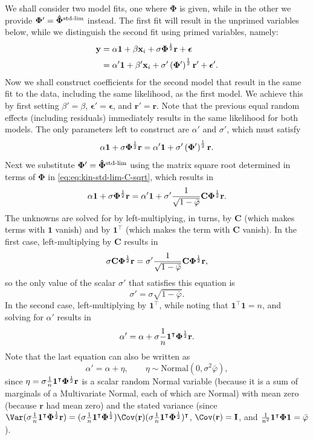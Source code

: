 \documentclass[11pt]{article}
\newcommand{\kinMat}{%
  \ensuremath{%
    \mathbf{\Phi}
  }%
  \xspace%
}%
\newcommand{\kinMatEstNamed}[1]{%
  \ensuremath{%
    \mathbf{\hat{\Phi}}^\text{#1}
  }%
  \xspace%
}%
\newcommand{\kinMatStdLim}{%
  \kinMatEstNamed{std-lim}
}%
\begin{document}
We shall consider two model fits, one where \kinMat is given, while in the other we provide $\kinMat' = \kinMatStdLim$ instead.
The first fit will result in the unprimed variables below, while we distinguish the second fit using primed variables, namely:
\begin{align*}
  \mathbf{y}
  &=
    \alpha \mathbf{1} + \beta \mathbf{x}_i + \sigma \kinMat^\frac{1}{2} \mathbf{r} + \boldsymbol{\epsilon}
  \\
  &=
    \alpha' \mathbf{1} + \beta' \mathbf{x}_i + \sigma' \left( \kinMat' \right)^\frac{1}{2} \mathbf{r}' + \boldsymbol{\epsilon}'
    .
\end{align*}
Now we shall construct coefficients for the second model that result in the same fit to the data, including the same likelihood, as the first model.
We achieve this by first setting
$\beta' = \beta$,
$\boldsymbol{\epsilon}' = \boldsymbol{\epsilon}$,
and
$\mathbf{r}' = \mathbf{r}$.
Note that the previous equal random effects (including residuals) immediately results in the same likelihood for both models.
The only parameters left to construct are $\alpha'$ and $\sigma'$, which must satisfy
$$
\alpha \mathbf{1}  + \sigma \kinMat^\frac{1}{2} \mathbf{r}
=
\alpha' \mathbf{1} + \sigma' \left( \kinMat' \right)^\frac{1}{2} \mathbf{r}
.
$$
Next we substitute $\kinMat' = \kinMatStdLim$ using the matrix square root determined in terms of \kinMat in \cref{eq:eq:kin-std-lim-C-sqrt}, which results in
$$
\alpha \mathbf{1} + \sigma \kinMat^\frac{1}{2} \mathbf{r}
=
\alpha' \mathbf{1} + \sigma'
\frac{1}{ \sqrt{ 1 - \bar{\varphi} } }
\mathbf{C} \kinMat^\frac{1}{2}
\mathbf{r}
.
$$
The unknowns are solved for by left-multiplying, in turns, by $\mathbf{C}$ (which makes terms with $\mathbf{1}$ vanish) and by $\mathbf{1}^\intercal$ (which makes the term with $\mathbf{C}$ vanish).
In the first case, left-multiplying by $\mathbf{C}$ results in
$$
\sigma \mathbf{C} \kinMat^\frac{1}{2} \mathbf{r}
=
\sigma'
\frac{1}{ \sqrt{ 1 - \bar{\varphi} } }
\mathbf{C} \kinMat^\frac{1}{2}
\mathbf{r}
,
$$
so the only value of the scalar $\sigma'$ that satisfies this equation is
$$
\sigma'
=
\sigma \sqrt{ 1 - \bar{\varphi} }
.
$$
In the second case, left-multiplying by $\mathbf{1}^\intercal$, while noting that $\mathbf{1}^\intercal \mathbf{1} = n$, and solving for $\alpha'$ results in
$$
\alpha'
=
\alpha  + \sigma \frac{1}{n} \mathbf{1}^\intercal \kinMat^\frac{1}{2} \mathbf{r}
.
$$
Note that the last equation can also be written as
$$
\alpha'
=
\alpha  + \eta
,
\quad\quad
\eta \sim \text{Normal}( 0, \sigma^2 \bar{\varphi} )
,
$$
since $\eta = \sigma \frac{1}{n} \mathbf{1}^\intercal \kinMat^\frac{1}{2} \mathbf{r}$ is a scalar random Normal variable (because it is a sum of marginals of a Multivariate Normal, each of which are Normal) with mean zero (because $\mathbf{r}$ had mean zero) and the stated variance (since $\Var( \sigma \frac{1}{n} \mathbf{1}^\intercal \kinMat^\frac{1}{2} \mathbf{r} ) = ( \sigma \frac{1}{n} \mathbf{1}^\intercal \kinMat^\frac{1}{2}) \Cov( \mathbf{r} ) ( \sigma \frac{1}{n} \mathbf{1}^\intercal \kinMat^\frac{1}{2} )^\intercal$, $\Cov( \mathbf{r} ) = \mathbf{I}$, and $\frac{1}{n^2} \mathbf{1}^\intercal \kinMat \mathbf{1} = \bar{\varphi}$).
\end{document}
